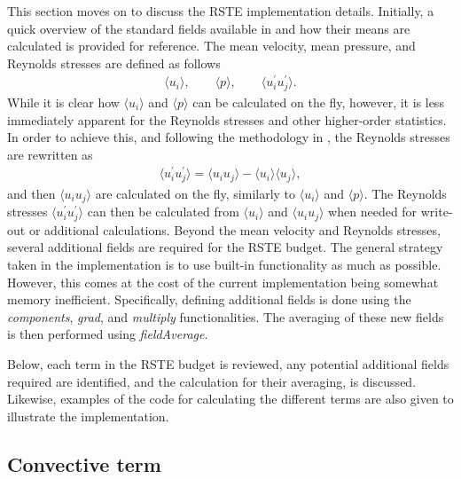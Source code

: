 This section moves on to discuss the RSTE implementation details.
Initially, a quick overview of the standard fields available in \OF and how their means are calculated is provided for reference.
The mean velocity, mean pressure, and Reynolds stresses are defined as follows
\begin{align}
    \langle u_i \rangle , 
    \qquad 
    \langle p \rangle,
    \qquad
    \langle u^{\prime}_i u^{\prime}_j \rangle .
\end{align}
While it is clear how $\langle u_i \rangle$ and $\langle p \rangle$ can be calculated on the fly, however, it is less immediately apparent for the Reynolds stresses and other higher-order statistics.
In order to achieve this, and following the methodology in \OF, the Reynolds stresses are rewritten as
\begin{align}
    \langle u^{\prime}_i u^{\prime}_j \rangle 
    =
    \langle u_i u_j \rangle - \langle u_i \rangle \langle u_j \rangle ,
\end{align}
and then $\langle u_i u_j \rangle$ are calculated on the fly, similarly to $\langle u_i \rangle$ and $\langle p \rangle$.
The Reynolds stresses $\langle u^{\prime}_i u^{\prime}_j \rangle$ can then be calculated from $\langle u_i \rangle$ and $\langle u_i u_j \rangle$ when needed for write-out or additional calculations.
Beyond the mean velocity and Reynolds stresses, several additional fields are required for the RSTE budget.
The general strategy taken in the implementation is to use built-in \OF functionality as much as possible.
However, this comes at the cost of the current implementation being somewhat memory inefficient.
Specifically, defining additional fields is done using the \emph{components}, \emph{grad}, and \emph{multiply} functionalities.
The averaging of these new fields is then performed using \emph{fieldAverage}.

Below, each term in the RSTE budget is reviewed, any potential additional fields required are identified, and the calculation for their averaging, is discussed.
Likewise, examples of the \OF code for calculating the different terms are also given to illustrate the implementation.

\subsection{Convective term}
\label{subsec:convective_term}

